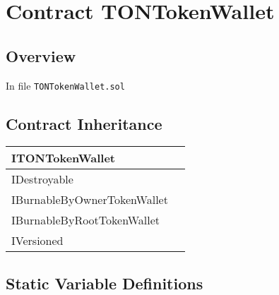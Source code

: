 
\chapter{Contract TONTokenWallet}

\minitoc

\section{Overview}


In file {\tt TONTokenWallet.sol}

\section{Contract Inheritance}


\noindent\begin{tabular}{|l|p{5cm}|}\hline
ITONTokenWallet & \\\hline
IDestroyable & \\\hline
IBurnableByOwnerTokenWallet & \\\hline
IBurnableByRootTokenWallet & \\\hline
IVersioned & \\\hline
\end{tabular}


\section{Static Variable Definitions}


